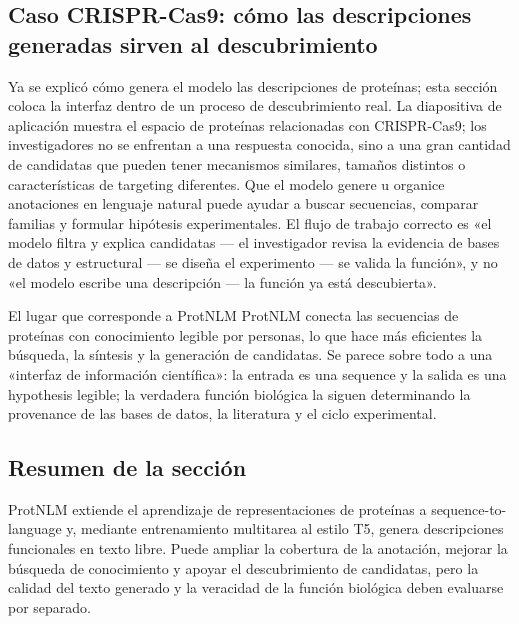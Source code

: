\subsection{Caso CRISPR-Cas9: cómo las descripciones generadas sirven al descubrimiento}

Ya se explicó cómo genera el modelo las descripciones de proteínas; esta sección coloca la interfaz dentro de un proceso de descubrimiento real. La diapositiva de aplicación muestra el espacio de proteínas relacionadas con CRISPR-Cas9; los investigadores no se enfrentan a una respuesta conocida, sino a una gran cantidad de candidatas que pueden tener mecanismos similares, tamaños distintos o características de targeting diferentes. Que el modelo genere u organice anotaciones en lenguaje natural puede ayudar a buscar secuencias, comparar familias y formular hipótesis experimentales. El flujo de trabajo correcto es «el modelo filtra y explica candidatas — el investigador revisa la evidencia de bases de datos y estructural — se diseña el experimento — se valida la función», y no «el modelo escribe una descripción — la función ya está descubierta».



\begin{importantbox}{El lugar que corresponde a ProtNLM}
ProtNLM conecta las secuencias de proteínas con conocimiento legible por personas, lo que hace más eficientes la búsqueda, la síntesis y la generación de candidatas. Se parece sobre todo a una «interfaz de información científica»: la entrada es una sequence y la salida es una hypothesis legible; la verdadera función biológica la siguen determinando la provenance de las bases de datos, la literatura y el ciclo experimental.
\end{importantbox}

\subsection{Resumen de la sección}

ProtNLM extiende el aprendizaje de representaciones de proteínas a sequence-to-language y, mediante entrenamiento multitarea al estilo T5, genera descripciones funcionales en texto libre. Puede ampliar la cobertura de la anotación, mejorar la búsqueda de conocimiento y apoyar el descubrimiento de candidatas, pero la calidad del texto generado y la veracidad de la función biológica deben evaluarse por separado.
